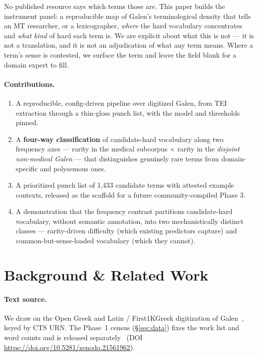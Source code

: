 \documentclass[11pt]{article}
\begin{document}
No published resource says which terms those are. This paper builds the instrument panel: a
reproducible map of Galen's terminological density that tells an MT researcher, or a lexicographer,
\textit{where} the hard vocabulary concentrates and \textit{what kind} of hard each term is. We are explicit about
what this is not --- it is not a translation, and it is not an adjudication of what any term means.
Where a term's sense is contested, we surface the term and leave the field blank for a domain
expert to fill.

\paragraph{Contributions.}
\begin{enumerate}[leftmargin=*,itemsep=2pt]
\item A reproducible, config-driven pipeline over digitized Galen, from TEI extraction through a
  thin-gloss punch list, with the model and thresholds pinned.
\item A \textbf{four-way classification} of candidate-hard vocabulary along two frequency axes --- rarity in
  the medical subcorpus $\times$ rarity in the \textit{disjoint non-medical Galen} --- that distinguishes
  genuinely rare terms from domain-specific and polysemous ones.
\item A prioritized punch list of 1,433 candidate terms with attested example contexts, released as
  the scaffold for a future community-compiled Phase 3.
\item A demonstration that the frequency contrast partitions candidate-hard vocabulary, without
  semantic annotation, into two mechanistically distinct classes --- rarity-driven difficulty
  (which existing predictors capture) and common-but-sense-loaded vocabulary (which they cannot).
\end{enumerate}

\section{Background \& Related Work}
\label{sec:background}

\paragraph{Text source.}
We draw on the Open Greek and Latin / First1KGreek digitization of Galen~\citep{first1kgreek},
keyed by CTS URN. The Phase~1 census (\S\ref{sec:data}) fixes the work list and word counts and
is released separately~\citep{pepperman-2026-galen-census}
(DOI \url{https://doi.org/10.5281/zenodo.21561962}).
\end{document}
